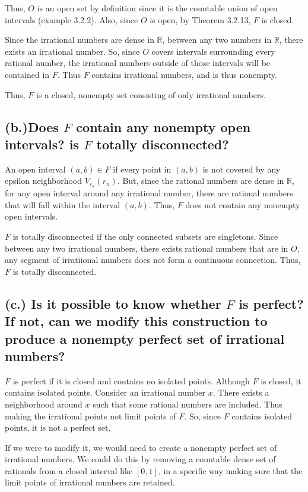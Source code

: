 \documentclass{article}
\begin{document}
Thus, $O$ is an open set by definition since it is the countable 
union of open intervals (example 3.2.2). Also, since $O$ is open, by Theorem 3.2.13, $F$ is 
closed. 

Since the irrational numbers are dense in $\mathbb{R}$, between any two numbers in 
$\mathbb{R}$, there exists an irrational number. So, since $O$ covers intervals surrounding 
every rational number, the irrational numbers outside of those intervals will be contained in $F$.
Thus $F$ contains irrational numbers, and is thus nonempty.

Thus, $F$ is a closed, nonempty set consisting of only irrational numbers.


\subsection*{(b.)Does $F$ contain any nonempty open intervals? is $F$ totally disconnected?}

An open interval $(a,b) \in F$ if every point in $(a,b)$ is not covered by any epsilon 
neighborhood $V_{\epsilon_n}(r_n)$. But, since the rational numbers are dense in $\mathbb{R}$, 
for any open interval around any irrational number, there are rational numbers that will fall within 
the interval $(a,b)$. Thus, $F$ does not contain any nonempty open intervals.

$F$ is totally disconnected if the only connected subsets are singletons. Since
 between any two irrational numbers, there exists rational numbers that are in $O$, any 
 segment of irratiional numbers does not form a continuous connection. Thus, $F$ is totally disconnected.

\subsection*{(c.) Is it possible to know whether $F$ is perfect? If not, can we modify this construction 
to produce a nonempty perfect set of irrational numbers?}

$F$ is perfect if it is closed and contains no isolated points. Although $F$ is closed, it contains isolated 
points. Consider an irrational number $x$. There exists a neighborhood around $x$ such that some rational 
numbers are included. Thus making the irrational points not limit points of $F$. So, since $F$ contains 
isolated points, it is not a perfect set.

If we were to modify it, we would need to create a nonempty perfect set of irrational numbers. We could do this by 
removing a countable dense set of rationals from a closed interval like $[0,1]$, in a specific way making sure that 
the limit points of irrational numbers are retained.
\end{document}
